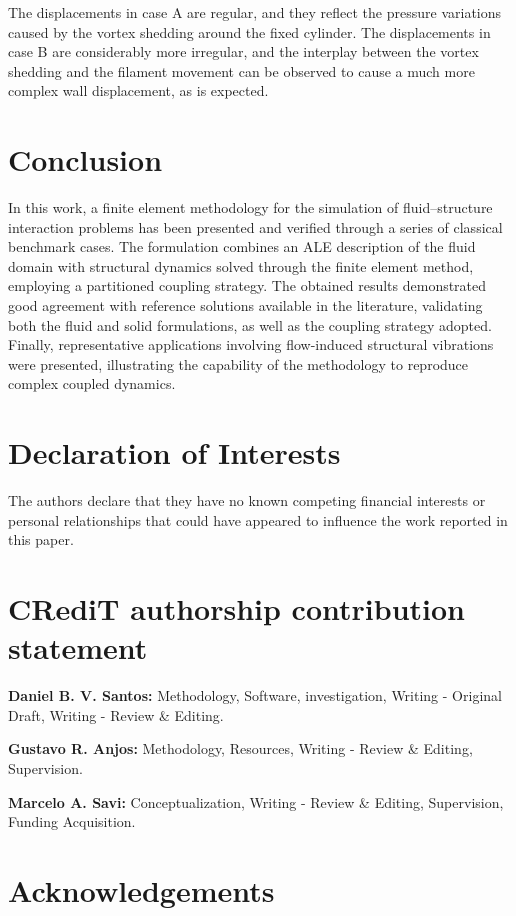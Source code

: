 \documentclass{article}
\begin{document}
The displacements in case A are regular, and they reflect the pressure variations caused by the vortex shedding around the fixed cylinder. The displacements in case B are considerably more irregular, and the interplay between the vortex shedding and the filament movement can be observed to cause a much more complex wall displacement, as is expected.

\section{Conclusion}

In this work, a finite element methodology for the simulation of fluid--structure interaction problems has been presented and verified through a series of classical benchmark cases. The formulation combines an ALE description of the fluid domain with structural dynamics solved through the finite element method, employing a partitioned coupling strategy. The obtained results demonstrated good agreement with reference solutions available in the literature, validating both the fluid and solid formulations, as well as the coupling strategy adopted. Finally, representative applications involving flow-induced structural vibrations were presented, illustrating the capability of the methodology to reproduce complex coupled dynamics.

\section{Declaration of Interests}

The authors declare that they have no known competing financial interests or personal relationships that could have appeared to influence the work reported in this paper.

\section{CRediT authorship contribution statement}

\textbf{Daniel B. V. Santos:} Methodology, Software, investigation, Writing - Original Draft, Writing - Review \& Editing.

\textbf{Gustavo R. Anjos:} Methodology, Resources, Writing - Review \& Editing, Supervision.

\textbf{Marcelo A. Savi:} Conceptualization, Writing - Review \& Editing, Supervision, Funding Acquisition. 

\section{Acknowledgements}

\printbibliography
\end{document}
